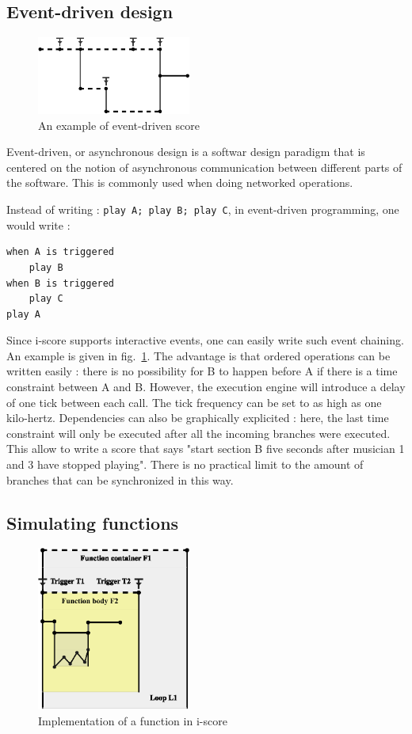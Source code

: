 \documentclass{article}
\begin{document}
\subsection{Event-driven design}
\begin{figure}
    \centering
    \includegraphics[width=0.45\textwidth]{images/event.eps}
    \caption{An example of event-driven score}
    \label{fig.event}
\end{figure}
Event-driven, or asynchronous design is a softwar design 
paradigm that is centered on the notion of asynchronous 
communication between different parts of the software.
This is commonly used when doing networked operations.

Instead of writing : 
\verb|play A; play B; play C|, in event-driven programming, one would write :
\begin{lstlisting}
when A is triggered
    play B
when B is triggered
    play C    
play A
\end{lstlisting}

Since i-score supports interactive events, one can easily write such event chaining.
An example is given in fig.~\ref{fig.event}. 
The advantage is that ordered operations can be written easily : there is no 
possibility for B to happen before A if there is a time constraint between A and B.
However, the execution engine will introduce a delay of one tick between each call.
The tick frequency can be set to as high as one kilo-hertz.
Dependencies can also be graphically explicited : here, the last time constraint will 
only be executed after all the incoming branches were executed. 
This allow to write a score that says "start section B five seconds after musician 1 and 3 
have stopped playing".
There is no practical limit to the amount of branches that can be synchronized in this way.

\subsection{Simulating functions}

\begin{figure}
\includegraphics[width=0.45\textwidth]{images/function.eps}
\caption{Implementation of a function in i-score}
\label{fig.function}
\end{figure}
\end{document}
